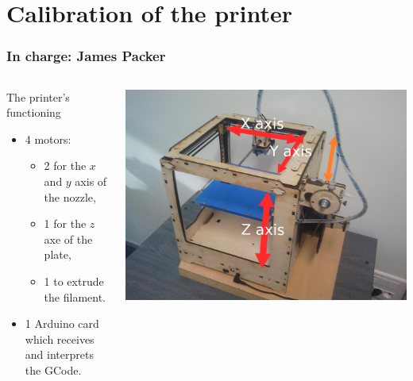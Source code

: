 \documentclass{beamer}
\begin{document}
\section{Calibration of the printer}
\begin{frame}
	\frametitle{In charge: James Packer}
    
    \begin{columns}[t]
  	\begin{column}{5cm}
    \begin{block}{The printer's functioning}
	\begin{itemize}
	\item 4 motors: 
		\begin{itemize}
		\item 2 for the $x$ and $y$ axis of the nozzle,
		\item 1 for the $z$ axe of the plate,
		\item 1 to extrude the filament.
		\end{itemize}
	\item 1 Arduino card which receives and interprets the GCode.
	\end{itemize}	
    \end{block}
    \end{column}

    \begin{column}{6cm}
        \begin{center}
		\includegraphics[width=.8\textwidth]{Ultimaker2}	
		\end{center}
    \end{column}

    \end{columns}
    
\end{frame}
\end{document}
